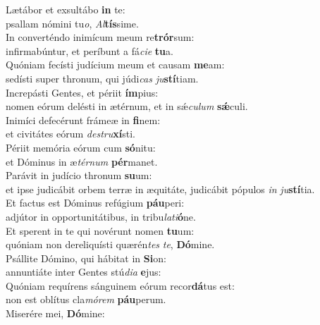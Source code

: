 \evenverse Lætábor et exsultábo \textbf{in} te:~\*\\
\evenverse psallam nómini tu\textit{o}, \textit{Al}\textbf{tís}sime.\\
\oddverse In converténdo inimícum meum re\textbf{trór}sum:~\*\\
\oddverse infirmabúntur, et períbunt a fá\textit{ci}\textit{e} \textbf{tu}a.\\
\evenverse Quóniam fecísti judícium meum et causam \textbf{me}am:~\*\\
\evenverse sedísti super thronum, qui júdi\textit{cas} \textit{ju}\textbf{stí}tiam.\\
\oddverse Increpásti Gentes, et périit \textbf{ím}pius:~\*\\
\oddverse nomen eórum delésti in ætérnum, et in sǽ\textit{cu}\textit{lum} \textbf{sǽ}culi.\\
\evenverse Inimíci defecérunt frámeæ in \textbf{fi}nem:~\*\\
\evenverse et civitátes eórum \textit{de}\textit{stru}\textbf{xí}sti.\\
\oddverse Périit memória eórum cum \textbf{só}nitu:~\*\\
\oddverse et Dóminus in æ\textit{tér}\textit{num} \textbf{pér}manet.\\
\evenverse Parávit in judício thronum \textbf{su}um:~\*\\
\evenverse et ipse judicábit orbem terræ in æquitáte, judicábit pópulos \textit{in} \textit{ju}\textbf{stí}tia.\\
\oddverse Et factus est Dóminus refúgium \textbf{páu}peri:~\*\\
\oddverse adjútor in opportunitátibus, in tribu\textit{la}\textit{ti}\textbf{ó}ne.\\
\evenverse Et sperent in te qui novérunt nomen \textbf{tu}um:~\*\\
\evenverse quóniam non dereliquísti quærén\textit{tes} \textit{te}, \textbf{Dó}mine.\\
\oddverse Psállite Dómino, qui hábitat in \textbf{Si}on:~\*\\
\oddverse annuntiáte inter Gentes stú\textit{di}\textit{a} \textbf{e}jus:\\
\evenverse Quóniam requírens sánguinem eórum recor\textbf{dá}tus est:~\*\\
\evenverse non est oblítus cla\textit{mó}\textit{rem} \textbf{páu}perum.\\
\oddverse Miserére mei, \textbf{Dó}mine:~\*\\
